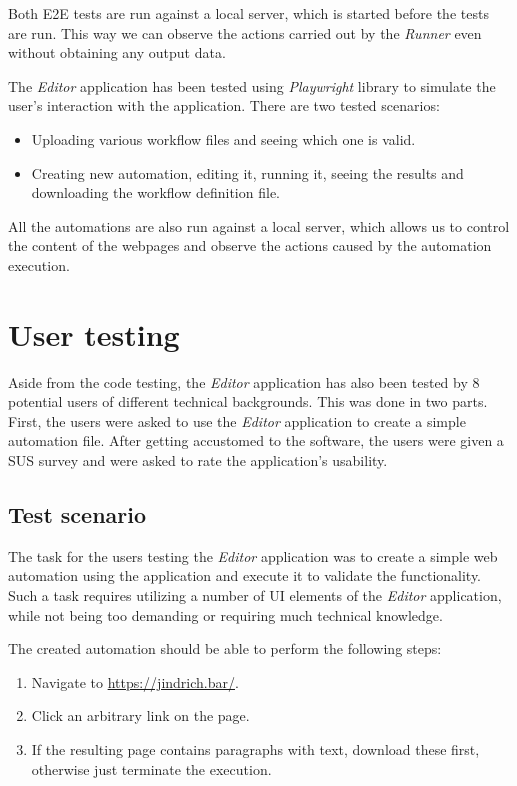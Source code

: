 Both \ac{E2E} tests are run against a local server, which is started before the tests are run.
This way we can observe the actions carried out by the \textit{Runner} even without obtaining any output data.

The \textit{Editor} application has been tested using \textit{Playwright} library to simulate the user's interaction with the application.
There are two tested scenarios:
\begin{itemize}
    \item Uploading various workflow files and seeing which one is valid. 
    \item Creating new automation, editing it, running it, seeing the results and downloading the workflow definition file.
\end{itemize}

All the automations are also run against a local server, which allows us to control the content of the webpages 
and observe the actions caused by the automation execution.

\section{User testing}

Aside from the code testing, the \textit{Editor} application has also been tested by 8 potential users of different technical backgrounds.
This was done in two parts.
First, the users were asked to use the \textit{Editor} application to create a simple automation file.
After getting accustomed to the software, the users were given a \ac{SUS} survey and were asked to rate the application's usability.

\subsection{Test scenario}

The task for the users testing the \textit{Editor} application was to create a simple web automation using the application and execute it to validate the functionality.
Such a task requires utilizing a number of \acs{UI} elements of the \textit{Editor} application, while not being too demanding or requiring much technical knowledge.

\smallskip
The created automation should be able to perform the following steps:
\begin{enumerate}
    \item Navigate to \href{https://jindrich.bar/}{https://jindrich.bar/}.
    \item Click an arbitrary link on the page.
    \item If the resulting page contains paragraphs with text, download these first, otherwise just terminate the execution.
\end{enumerate}
    
